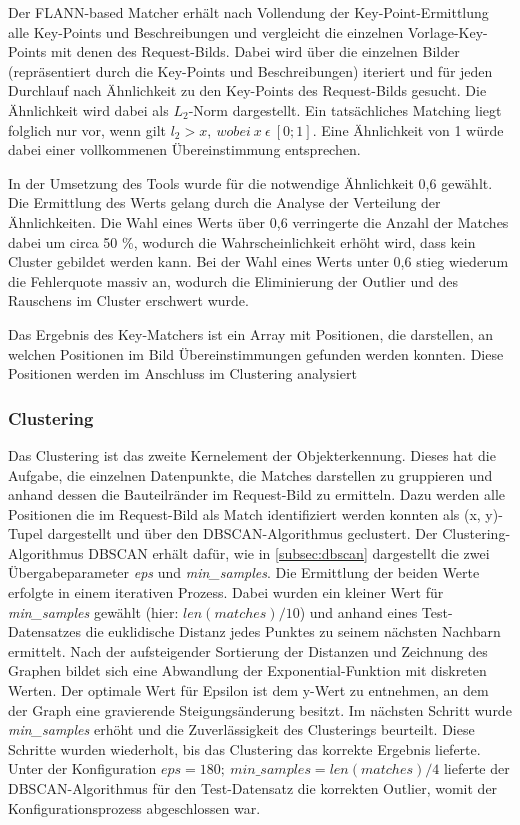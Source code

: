 \documentclass[
    type=Projektarbeit,
    status=draft, %
    language=german, %
    bibengine=bibtex,
]{unibwm-inf-thesis}
\begin{document}
    Der FLANN-based Matcher erhält nach Vollendung der Key-Point-Ermittlung alle Key-Points und Beschreibungen und vergleicht die einzelnen Vorlage-Key-Points mit denen des Request-Bilds.
    Dabei wird über die einzelnen Bilder (repräsentiert durch die Key-Points und Beschreibungen) iteriert und für jeden Durchlauf nach Ähnlichkeit zu den Key-Points des Request-Bilds gesucht.
    Die Ähnlichkeit wird dabei als $L_{2}$-Norm dargestellt.
    Ein tatsächliches Matching liegt folglich nur vor, wenn gilt $l_{2} > x,~wobei~x~\epsilon~[0; 1]$.
    Eine Ähnlichkeit von 1 würde dabei einer vollkommenen Übereinstimmung entsprechen.

    In der Umsetzung des Tools wurde für die notwendige Ähnlichkeit 0,6 gewählt.
    Die Ermittlung des Werts gelang durch die Analyse der Verteilung der Ähnlichkeiten.
    Die Wahl eines Werts über 0,6 verringerte die Anzahl der Matches dabei um circa 50 \%, wodurch die Wahrscheinlichkeit erhöht wird, dass kein Cluster gebildet werden kann.
    Bei der Wahl eines Werts unter 0,6 stieg wiederum die Fehlerquote massiv an, wodurch die Eliminierung der Outlier und des Rauschens im Cluster erschwert wurde.

    Das Ergebnis des Key-Matchers ist ein Array mit Positionen, die darstellen, an welchen Positionen im Bild Übereinstimmungen gefunden werden konnten.
    Diese Positionen werden im Anschluss im Clustering analysiert

    \subsubsection{Clustering} \label{subsubsec:clustering}
    Das Clustering ist das zweite Kernelement der Objekterkennung.
    Dieses hat die Aufgabe, die einzelnen Datenpunkte, die Matches darstellen zu gruppieren und anhand dessen die Bauteilränder im Request-Bild zu ermitteln.
    Dazu werden alle Positionen die im Request-Bild als Match identifiziert werden konnten als (x, y)-Tupel dargestellt und über den DBSCAN-Algorithmus geclustert.
    Der Clustering-Algorithmus DBSCAN erhält dafür, wie in \autoref{subsec:dbscan} dargestellt die zwei Übergabeparameter \textit{eps} und \textit{min\_samples}.
    Die Ermittlung der beiden Werte erfolgte in einem iterativen Prozess.
    Dabei wurden ein kleiner Wert für \textit{min\_samples} gewählt (hier: $len(matches) / 10 $) und anhand eines Test-Datensatzes die euklidische Distanz jedes Punktes zu seinem nächsten Nachbarn ermittelt.
    Nach der aufsteigender Sortierung der Distanzen und Zeichnung des Graphen bildet sich eine Abwandlung der Exponential-Funktion mit diskreten Werten.
    Der optimale Wert für Epsilon ist dem y-Wert zu entnehmen, an dem der Graph eine gravierende Steigungsänderung besitzt.\citep{Maklin2019}
    Im nächsten Schritt wurde \textit{min\_samples} erhöht und die Zuverlässigkeit des Clusterings beurteilt.
    Diese Schritte wurden wiederholt, bis das Clustering das korrekte Ergebnis lieferte.
    Unter der Konfiguration $eps = 180; ~ min\_samples=len(matches) / 4$ lieferte der DBSCAN-Algorithmus für den Test-Datensatz die korrekten Outlier, womit der Konfigurationsprozess abgeschlossen war.
\end{document}
